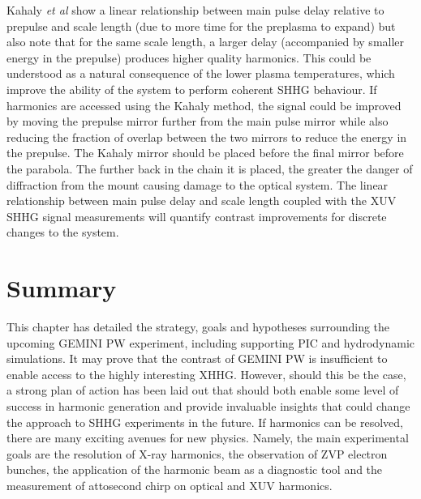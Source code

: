 Kahaly \textit{et al} show a linear relationship between main pulse delay relative to prepulse and scale length (due to more time for the preplasma to expand) but also note that for the same scale length, a larger delay (accompanied by smaller energy in the prepulse) produces higher quality harmonics. This could be understood as a natural consequence of the lower plasma temperatures, which improve the ability of the system to perform coherent SHHG behaviour. If harmonics are accessed using the Kahaly method, the signal could be improved by moving the prepulse mirror further from the main pulse mirror while also reducing the fraction of overlap between the two mirrors to reduce the energy in the prepulse. The Kahaly mirror should be placed before the final mirror before the parabola. The further back in the chain it is placed, the greater the danger of diffraction from the mount causing damage to the optical system. The linear relationship between main pulse delay and scale length coupled with the XUV SHHG signal measurements will quantify contrast improvements for discrete changes to the system.

\section{Summary}
This chapter has detailed the strategy, goals and hypotheses surrounding the upcoming GEMINI PW experiment, including supporting PIC and hydrodynamic simulations. It may prove that the contrast of GEMINI PW is insufficient to enable access to the highly interesting XHHG. However, should this be the case, a strong plan of action has been laid out that should both enable some level of success in harmonic generation and provide invaluable insights that could change the approach to SHHG experiments in the future. If harmonics can be resolved, there are many exciting avenues for new physics. Namely, the main experimental goals are the resolution of X-ray harmonics, the observation of ZVP electron bunches, the application of the harmonic beam as a diagnostic tool and the measurement of attosecond chirp on optical and XUV harmonics.